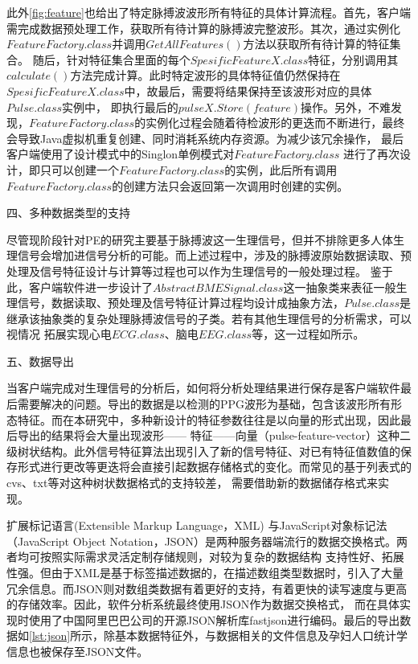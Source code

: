 此外\autoref{fig:feature}也给出了特定脉搏波波形所有特征的具体计算流程。首先，客户端需完成数据预处理工作，获取所有待计算的脉搏波完整波形。其次，通过实例化$FeatureFactory.class$并调用$GetAllFeatures()$方法以获取所有待计算的特征集合。
随后，针对特征集合里面的每个$SpesificFeatureX.class$特征，分别调用其$calculate()$方法完成计算。此时特定波形的具体特征值仍然保持在$SpesificFeatureX.class$中，故最后，需要将结果保持至该波形对应的具体$Pulse.class$实例中，
即执行最后的$pulseX.Store(feature)$操作。另外，不难发现，$FeatureFactory.class$的实例化过程会随着待检波形的更迭而不断进行，最终会导致Java虚拟机重复创建、同时消耗系统内存资源。为减少该冗余操作，
最后客户端使用了设计模式中的Singlon单例模式\cite{Li2015}对$FeatureFactory.class$
进行了再次设计，即只可以创建一个$FeatureFactory.class$的实例，此后所有调用$FeatureFactory.class$的创建方法只会返回第一次调用时创建的实例。

四、多种数据类型的支持

尽管现阶段针对PE的研究主要基于脉搏波这一生理信号，但并不排除更多人体生理信号会增加进信号分析的可能。而上述过程中，涉及的脉搏波原始数据读取、预处理及信号特征设计与计算等过程也可以作为生理信号的一般处理过程。
鉴于此，客户端软件进一步设计了$AbstractBMESignal.class$这一抽象类来表征一般生理信号，数据读取、预处理及信号特征计算过程均设计成抽象方法，$Pulse.class$是继承该抽象类的复杂处理脉搏波信号的子类。若有其他生理信号的分析需求，可以视情况
拓展实现心电$ECG.class$、脑电$EEG.class$等，这一过程如所示。

五、数据导出

当客户端完成对生理信号的分析后，如何将分析处理结果进行保存是客户端软件最后需要解决的问题。导出的数据是以检测的PPG波形为基础，包含该波形所有形态特征。而在本研究中，多种新设计的特征参数往往是以向量的形式出现，因此最后导出的结果将会大量出现波形——
特征——向量（pulse-feature-vector）这种二级树状结构。此外信号特征算法出现引入了新的信号特征、对已有特征值数值的保存形式进行更改等更迭将会直接引起数据存储格式的变化。而常见的基于列表式的cvs、txt等对这种树状数据格式的支持较差，
需要借助新的数据储存格式来实现。

扩展标记语言(Extensible Markup Language，XML) \cite{xml,Li2016}与JavaScript对象标记法（JavaScript Object Notation，JSON）\cite{json,Crockford2006}是两种服务器端流行的数据交换格式。两者均可按照实际需求灵活定制存储规则，对较为复杂的数据结构
支持性好、拓展性强。但由于XML是基于标签描述数据的，在描述数组类型数据时，引入了大量冗余信息。而JSON则对数组类数据有着更好的支持，有着更快的读写速度与更高的存储效率\cite{Nurseitov2009}。因此，软件分析系统最终使用JSON作为数据交换格式，
而在具体实现时使用了中国阿里巴巴公司的开源JSON解析库fastjson\cite{fastjson}进行编码。最后的导出数据如\autoref{lst:json}所示，除基本数据特征外，与数据相关的文件信息及孕妇人口统计学信息也被保存至JSON文件。


